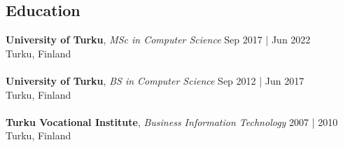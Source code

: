 \documentclass[line,margin]{res}
\begin{document}
\address{jani.anttonen@protonmail.ch | +358 40 589 0039 | Turku, Finland | https://janianttonen.com}
\begin{resume}
	\vspace{-5mm}
	        
	
	\section{Education}
	\textbf{University of Turku}, {\sl MSc in Computer Science} \hfill Sep 2017 | Jun 2022\\Turku, Finland\\\\
	\textbf{University of Turku}, {\sl BS in Computer Science} \hfill Sep 2012 | Jun 2017\\Turku, Finland\\\\
	\textbf{Turku Vocational Institute}, {\sl Business Information Technology} \hfill 2007 | 2010\\Turku, Finland

\end{resume}
\end{document}
